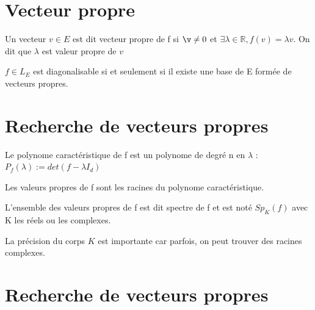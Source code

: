 \documentclass[french]{yLectureNote}
\newcommand{\R}[0]{\mathbb{R}}
\begin{document}
\section{Vecteur propre}
\begin{definition}
Un vecteur \(v\in E\) est dit vecteur propre de f si \(\v \neq 0\) et \(\exists \lambda \in \R, f(v)=\lambda v\). On dit que \(\lambda\) est valeur propre de \(v\)
\end{definition}
\begin{theorem}
 \(f \in L_E\) est diagonalisable si et seulement si il existe
une base de E formée de vecteurs propres.
\end{theorem}
\section{Recherche de vecteurs propres}
\begin{definition}
Le polynome caractéristique de f est un polynome de degré n en \(\lambda\) : \(P_f(\lambda):= det(f-\lambda I_d)\)
\end{definition}
\begin{proposition}
Les valeurs propres de f sont les racines du polynome caractéristique.
\end{proposition}
\begin{definition}[Spectre]
L’ensemble des valeurs propres de f est dit spectre de f et est noté \(Sp_K (f)\) avec K les réels ou les complexes.
\end{definition}
La précision du corps \(K\) est importante car parfois, on peut trouver des racines complexes.
\section{Recherche de vecteurs propres}
\end{document}
